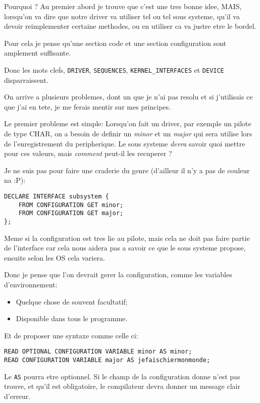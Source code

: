 \documentclass{rtxreport}
\begin{document}
Pourquoi ?
Au premier abord je trouve que c'est une tres bonne idee, MAIS, lorsqu'on
va dire que notre driver va utiliser tel ou tel sous systeme, qu'il va devoir
reimplementer certaine methodes, ou en utiliser ca va justre etre le bordel.

Pour cela je pense qu'une section code et une section configuration sont
amplement suffisante.

Donc les mots clefs, \texttt{DRIVER}, \texttt{SEQUENCES},
\texttt{KERNEL\_INTERFACES} et \texttt{DEVICE} disparraissent.

On arrive a plusieurs problemes, dont un que je n'ai pas resolu et si j'utilisais
ce que j'ai en tete, je me ferais mentir sur mes principes.

Le premier probleme est simple:
Lorsqu'on fait un driver, par exemple un pilote de type CHAR, on a besoin
de definir un \emph{minor} et un \emph{major} qui sera utilise lors
de l'enregistrement du peripherique. Le sous systeme \emph{devra} savoir
quoi mettre pour ces valeurs, mais \emph{comment} peut-il les recuperer ?

Je ne suis pas pour faire une craderie du genre (d'ailleur il n'y a pas de couleur na :P):

\begin{lstlisting}
DECLARE INTERFACE subsystem {
	FROM CONFIGURATION GET minor;
	FROM CONFIGURATION GET major;
};
\end{lstlisting}

Meme si la configuration est tres lie au pilote,
mais cela ne doit pas faire partie de l'interface car
cela nous aidera pas a savoir ce que le sous systeme propose,
ensuite selon les OS cela variera.

Donc je pense que l'on devrait gerer la configuration, comme 
les variables d'environnement:
\begin{itemize}
	\item Quelque chose de souvent facultatif;
	\item Disponible dans tous le programme.
\end{itemize}

Et de proposer une syntaxe comme celle ci:

\begin{lstlisting}
READ OPTIONAL CONFIGURATION VARIABLE minor AS minor;
READ CONFIGURATION VARIABLE major AS jefaischiermonmonde;
\end{lstlisting}

Le \texttt{AS} pourra etre optionnel.
Si le champ de la configuration donne n'est pas trouve, et qu'il
est obligatoire, le compilateur devra donner un message clair d'erreur.
\end{document}
